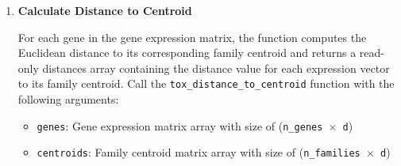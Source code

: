 \documentclass[11pt]{article}
\begin{document}
\begin{enumerate}
    \textbf{Mathematical Definition:}
    \[ \text{shift\_vector} = \text{expression\_vector} - \text{family\_centroid} \]
    
    \textbf{Arguments:}
    \begin{itemize}
        \item \texttt{expression\_vectors}: 2D numpy array of shape \texttt{(n\_axes, n\_vectors)} where each column is a gene expression vector
        \item \texttt{family\_centroids}: 2D numpy array of shape \texttt{(n\_axes, n\_families)} where each column is a family centroid vector
        \item \texttt{gene\_to\_centroid}: 1D numpy array of length \texttt{n\_vectors} containing 1-based family indices mapping each gene to its centroid
    \end{itemize}
    \textbf{Returns:}
    \begin{itemize}
        \item \texttt{shift\_vectors}: 2D numpy array of shape \texttt{(2*n\_axes, n\_vectors)} containing centroids (rows 0:n\_axes-1) and shift vectors (rows n\_axes:2*n\_axes-1) (read-only)
    \end{itemize}
    \begin{lstlisting}[language=Python, caption={Python Shift Vector Field Computation}]
shift_vectors = tox_compute_shift_vector_field(expression_vectors, 
                                family_centroids, gene_to_centroid)
    \end{lstlisting}
	      
	\item \textbf{Calculate Distance to Centroid}
	      
	      For each gene in the gene expression matrix, the function computes the
	      Euclidean distance to its corresponding family centroid and returns a read-only
	      distances array containing the distance value for each expression vector
	      to its family centroid. Call the \texttt{tox\_distance\_to\_centroid}
	      function with the following arguments:
	      
	      \begin{itemize}
	      	\item \texttt{genes}: Gene expression matrix array with size of (\texttt{n\_genes
	      	      $\times$ d})
	      	
	      	\item \texttt{centroids}: Family centroid matrix array with size of (\texttt{n\_families
	      	      $\times$ d})
	      	

\end{itemize}
\end{enumerate}
\end{document}
